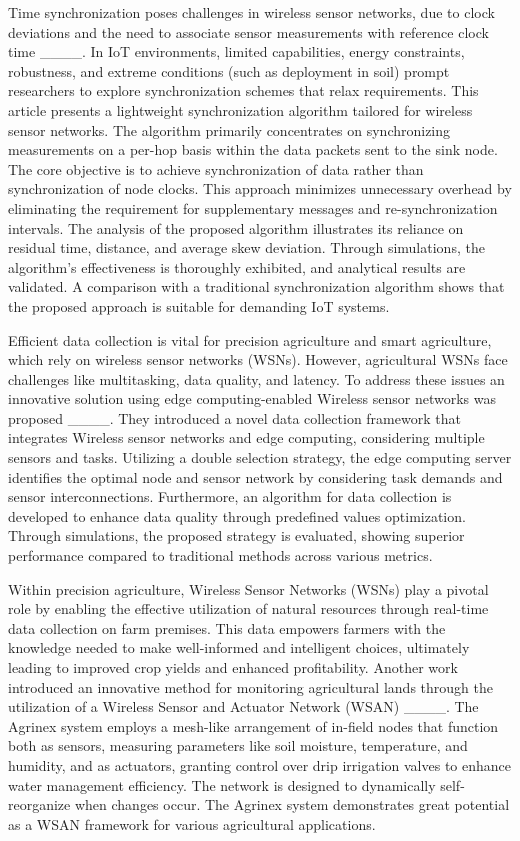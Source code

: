Time synchronization poses challenges in wireless sensor networks, due to clock deviations and the need to associate sensor measurements with reference clock time ____. In IoT environments, limited capabilities, energy constraints, robustness, and 
extreme conditions (such as deployment in soil) prompt researchers to explore synchronization schemes that relax requirements. This article presents a lightweight synchronization algorithm tailored for wireless sensor networks. The algorithm primarily concentrates on synchronizing measurements on a per-hop basis within the data packets sent to the sink node. The core objective is to achieve synchronization of data rather than synchronization of node clocks. This approach minimizes unnecessary overhead by eliminating the requirement for supplementary messages and re-synchronization intervals. The analysis of the proposed algorithm illustrates its reliance on residual time, distance, and average skew deviation. Through simulations, the algorithm's effectiveness is thoroughly exhibited, and analytical results are validated. A comparison with a traditional synchronization algorithm shows that the proposed approach is suitable for demanding IoT systems.

Efficient data collection is vital for precision agriculture and smart agriculture, which rely on wireless sensor networks (WSNs). However, agricultural WSNs face challenges like multitasking, data quality, and latency. To address these issues an innovative solution using edge computing-enabled Wireless sensor networks was proposed ____. They introduced a novel data collection framework that integrates Wireless sensor networks and edge computing, considering multiple sensors and tasks. Utilizing a double selection strategy, the edge computing server identifies the optimal node and sensor network by considering task demands and sensor interconnections. Furthermore, an algorithm for data collection is developed to enhance data quality through predefined values optimization. Through simulations, the proposed strategy is evaluated, showing superior performance compared to traditional methods across various metrics.

Within precision agriculture, Wireless Sensor Networks (WSNs) play a pivotal role by enabling the effective utilization of natural resources through real-time data collection on farm premises. This data empowers farmers with the knowledge needed to make well-informed and intelligent choices, ultimately leading to improved crop yields and enhanced profitability. Another work introduced an innovative method for monitoring agricultural lands through the utilization of a Wireless Sensor and Actuator Network (WSAN) ____. The Agrinex system employs a mesh-like arrangement of in-field nodes that function both as sensors, measuring parameters like soil moisture, temperature, and humidity, and as actuators, granting control over drip irrigation valves to enhance water management efficiency. The network is designed to dynamically self-reorganize when changes occur. The Agrinex system demonstrates great potential as a WSAN framework for various agricultural applications.

